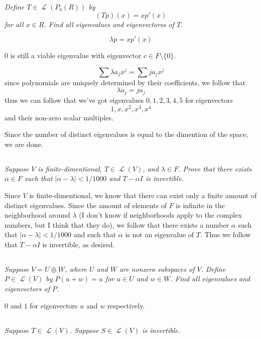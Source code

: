 \documentclass[11pt,oneside,titlepage]{book}
\DeclareMathOperator \map {\mathcal {L}}
\begin{document}
\textit{Define $T \in \map(P_4(R))$ by}
$$(Tp)(x) = xp'(x)$$
\textit{for all $x \in R$. Find all eigenvalues and eigenvectorss of $T$.}

$$\lambda p = x p'(x)$$

$0$ is still a viable eigenvalue with eigenvector $c \in F \setminus \{0\}$.

$$ \sum \lambda a_j x^j = \sum j a_j x^j$$
since polynomials are uniquely determined by their coefficients, we follow that
$$ \lambda a_j = j a_j$$
thus we can follow that we've got eigenvalues $0, 1, 2, 3, 4, 5$ for eigenvectors
$$1, x, x^2, x^3, x^4$$ and their non-zero scalar multiples.

Since the number of distinct eigenvalues is equal to the dimention of the space, we are done.

\subsection{}

\textit{Suppose $V$ is finite-dimentional, $T \in \map(V)$, and $\lambda \in F$. Prove that there
  exists $\alpha \in F$ such that $|\alpha - \lambda| < 1/1000$ and $T - \alpha I$ is
  invertible.}

Since $V$ is finite-dimentional, we know that there can exist only a finite amount of distinct
eigenvalues. Since the amount of elements of $F$ is infinite in the neighborhood around
$\lambda$ (I don't know if neighborhoods apply to the complex numbers, but I think that they do),
we follow that there exists a number $\alpha$ such that $|\alpha - \lambda| < 1/1000$ and
such that $\alpha$ is not an eigenvalue of $T$. Thus we follow that $T - \alpha I$ is
invertible, as desired.

\subsection{}

\textit{Suppose $V = U \oplus W$, where $U$ and $W$ are nonzero subspaces of $V$. Define
  $P \in \map(V)$ by $P(u + w) = u$ for $u \in U$ and $w \in W$. Find all eigenvalues
  and eigenvectors of $P$.}

$0$ and $1$ for eigenvectors $u$ and $w$ respectively.

\subsection{}

\textit{Suppose $T \in \map(V)$. Suppose $S \in \map(V)$ is invertible.}
\end{document}
